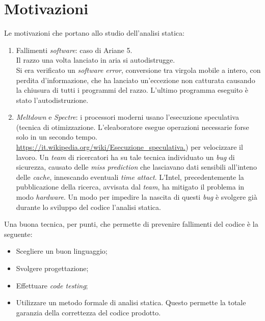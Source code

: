 \documentclass[10pt,                    %
               a4paper,                 %
               twoside,                 %
               openright,               %
               english,                 
               italian,                 
               ]{book}
\begin{document}
\section{Motivazioni}
Le motivazioni che portano allo studio dell'analisi statica:
\begin{enumerate}
\item Fallimenti \textit{software}: caso di Ariane 5.\\
Il razzo una volta lanciato in aria si autodistrugge.\\
Si era verificato un \textit{software error}, conversione tra virgola mobile a intero, con perdita d'informazione, che ha lanciato un'eccezione non catturata causando la chiusura di tutti i programmi del razzo. L'ultimo programma eseguito \`e stato l'autodistruzione.
\item \textit{Meltdown} e \textit{Spectre}: i processori moderni usano l'esecuzione speculativa (tecnica di otimizzazione. L'eleaboratore esegue operazioni necessarie forse solo in un secondo tempo. \url{https://it.wikipedia.org/wiki/Esecuzione_speculativa.}) per velocizzare il lavoro. Un \textit{team} di ricercatori ha su tale tecnica individuato un \textit{bug} di sicurezza, causato delle \textit{miss prediction} che lasciavano dati sensibili all'inteno delle \textit{cache}, innescando eventuali \textit{time attact}.
L'Intel, precedentemente la pubblicazione della ricerca, avvisata dal \textit{team}, ha mitigato il problema in modo \textit{hardware}. Un modo per impedire la nascita di questi \textit{bug} \`e svolgere gi\`a durante lo sviluppo del codice l'analisi statica. 
\end{enumerate}
\noindent
Una buona tecnica, per punti, che permette di prevenire fallimenti del codice \`e la seguente:
\begin{itemize}
\item Scegliere un buon linguaggio;
\item Svolgere progettazione;
\item Effettuare \textit{code testing};
\item Utilizzare un metodo formale di analisi statica. Questo permette la totale garanzia della correttezza del codice prodotto.
\end{itemize}
\end{document}
